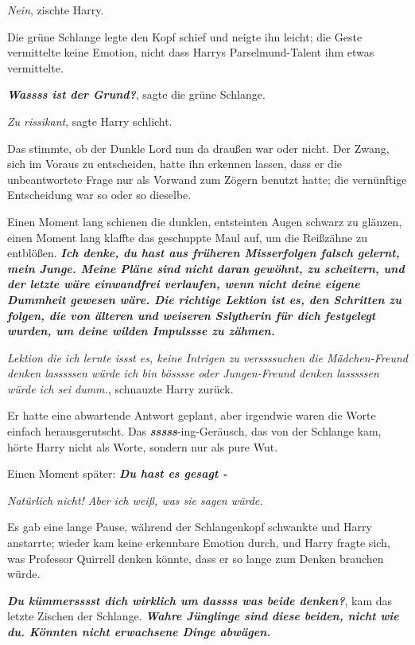 \glqq \emph{Nein}\grqq{}, zischte Harry.

Die grüne Schlange legte den Kopf schief und neigte ihn leicht; die Geste
vermittelte keine Emotion, nicht dass Harrys Parselmund-Talent ihm etwas
vermittelte.

\glqq \textbf{\emph{Wassss ist der Grund?}}\grqq{}, sagte die grüne Schlange.

\glqq \emph{Zu rissikant}\grqq{}, sagte Harry schlicht.

Das stimmte, ob der Dunkle Lord nun da draußen war oder nicht. Der Zwang, sich
im Voraus zu entscheiden, hatte ihn erkennen lassen, dass er die unbeantwortete
Frage nur als Vorwand zum Zögern benutzt hatte; die vernünftige Entscheidung war
so oder so dieselbe.

Einen Moment lang schienen die dunklen, entsteinten Augen schwarz zu glänzen,
einen Moment lang klaffte das geschuppte Maul auf, um die Reißzähne zu
entblößen. \glqq \textbf{\emph{Ich denke, du hast aus früheren Misserfolgen
falsch gelernt, mein Junge. Meine Pläne sind nicht daran gewöhnt, zu scheitern,
und der letzte wäre einwandfrei verlaufen, wenn nicht deine eigene Dummheit
gewesen wäre. Die richtige Lektion ist es, den Schritten zu folgen, die von
älteren und weiseren Sslytherin für dich festgelegt wurden, um deine wilden
Impulssse zu zähmen.}}\grqq{}

\glqq \emph{Lektion die ich lernte issst es, keine Intrigen zu verssssuchen die
Mädchen-Freund denken lasssssen würde ich bin bösssse oder Jungen-Freund denken
lasssssen würde ich sei dumm.}\grqq{}, schnauzte Harry zurück.

Er hatte eine abwartende Antwort geplant, aber irgendwie waren die Worte einfach
herausgerutscht. Das \textbf{\emph{sssss}}-ing-Geräusch, das von der Schlange
kam, hörte Harry nicht als Worte, sondern nur als pure Wut.

Einen Moment später: \glqq \textbf{\emph{Du hast es gesagt -}}\grqq{}

\glqq \emph{Natürlich nicht! Aber ich weiß, was sie sagen würde.}\grqq{}

Es gab eine lange Pause, während der Schlangenkopf schwankte und Harry
anstarrte; wieder kam keine erkennbare Emotion durch, und Harry fragte sich, was
Professor Quirrell denken könnte, dass er so lange zum Denken brauchen würde.

\glqq \textbf{\emph{Du kümmersssst dich wirklich um dassss was beide
denken?}}\grqq{}, kam das letzte Zischen der Schlange. \glqq \textbf{\emph{Wahre
Jünglinge sind diese beiden, nicht wie du. Könnten nicht erwachsene Dinge
abwägen.}}\grqq{}

